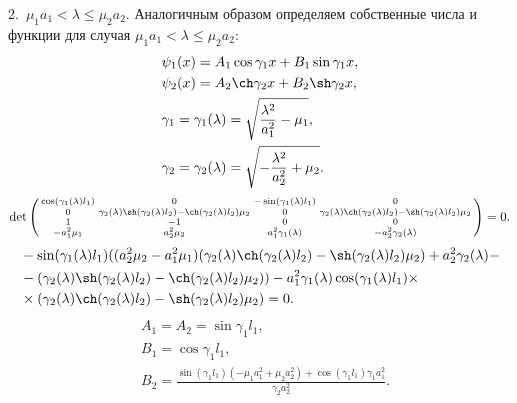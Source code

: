 \documentclass[12pt, a4paper, draft]{article}
\begin{document}
2.\ $ \mu_1a_1 < \lambda \le \mu_2a_2 $. Аналогичным образом определяем собственные числа и функции для случая $ \mu_1a_1 < \lambda \le \mu_2a_2 $:
\begin{equation}
  \begin{aligned}
    & \psi_1(x) = A_1 \cos \gamma_1x + B_1 \sin \gamma_1x, \\
    & \psi_2(x) = A_2 \ch \gamma_2x + B_2 \sh \gamma_2x, \\
    & \gamma_1 = \gamma_1(\lambda) = \sqrt{\frac{\lambda^2}{a_1^2} - \mu_1}, \\
    & \gamma_2 = \gamma_2(\lambda) = \sqrt{- \frac{\lambda^2}{a_2^2} + \mu_2}.
  \end{aligned}
  \label{eq:6}
\end{equation}
\begin{equation}
  \det \left(  
  \begin{smallmatrix}
    \cos(\gamma_1(\lambda) l_1) & 0 & -\sin(\gamma_1(\lambda) l_1) & 0 \\
    0 & \gamma_2(\lambda) \sh(\gamma_2(\lambda) l_2)-\ch(\gamma_2(\lambda) l_2) \mu_2 & 0 & \gamma_2(\lambda) \ch(\gamma_2(\lambda) l_2)-\sh(\gamma_2(\lambda) l_2) \mu_2 \\
    1 & -1 & 0 & 0 \\
    -a_1^2 \mu_1 & a_2^2 \mu_2 & a_1^2 \gamma_1(\lambda) & -a_2^2 \gamma_2(\lambda) \\
  \end{smallmatrix}
  \right) = 0.
\end{equation}
\begin{equation}
  \begin{aligned}
  & -\sin(\gamma_1(\lambda) l_1) ((a_2^2 \mu_2-a_1^2 \mu_1) (\gamma_2(\lambda) \ch(\gamma_2(\lambda) l_2)-\sh(\gamma_2(\lambda) l_2) \mu_2)+a_2^2 \gamma_2(\lambda)- \\
  & -(\gamma_2(\lambda) \sh(\gamma_2(\lambda) l_2)-\ch(\gamma_2(\lambda) l_2) \mu_2))-a_1^2 \gamma_1(\lambda) \cos(\gamma_1(\lambda) l_1) \times \\
  & \times (\gamma_2(\lambda) \ch(\gamma_2(\lambda) l_2)-\sh(\gamma_2(\lambda) l_2) \mu_2) = 0.
  \end{aligned}
\end{equation}
\begin{equation}
  \begin{aligned}
    & A_1 = A_2 = \sin \gamma_1l_1, \\
    & B_1 = \cos \gamma_1l_1, \\
    & B_2 = \frac{\sin (\gamma_1l_1) (-\mu_1 a_1^2 + \mu_2 a_2^2) + \cos (\gamma_1l_1) \gamma_1 a_1^2}{\gamma_2a_2^2}.
  \end{aligned}
\end{equation}
\end{document}
